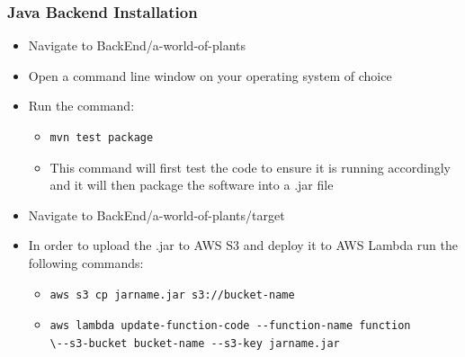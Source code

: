 \documentclass{article}
\begin{document}
		\subsubsection{Java Backend Installation}
			\begin{itemize}
				\item Navigate to BackEnd/a-world-of-plants
				\item Open a command line window on your operating system of choice
				\item Run the command:
				\begin{itemize}
					\item 
\begin{lstlisting}
mvn test package
\end{lstlisting}
					\item This command will first test the code to ensure it is running accordingly and it will then package the software into a .jar file
				\end{itemize}
				\item Navigate to BackEnd/a-world-of-plants/target
				\item In order to upload the .jar to AWS S3 and deploy it to AWS Lambda run the following commands:
					\begin{itemize}
						\item 
\begin{lstlisting}
aws s3 cp jarname.jar s3://bucket-name
\end{lstlisting}

						\item
\begin{lstlisting}
aws lambda update-function-code --function-name function 
\--s3-bucket bucket-name --s3-key jarname.jar
\end{lstlisting}
					\end{itemize}	
			\end{itemize}
\end{document}
